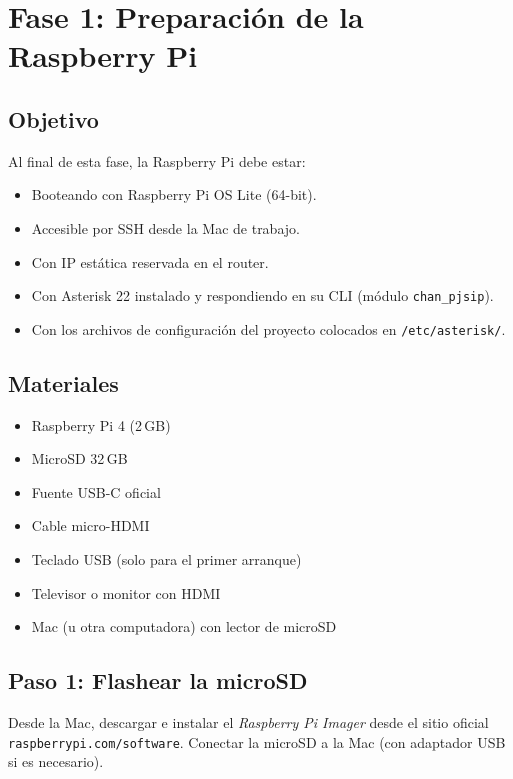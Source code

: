 \chapter{Fase 1: Preparación de la Raspberry Pi}

\section{Objetivo}

Al final de esta fase, la Raspberry Pi debe estar:

\begin{itemize}
  \item Booteando con Raspberry Pi OS Lite (64-bit).
  \item Accesible por SSH desde la Mac de trabajo.
  \item Con IP estática reservada en el router.
  \item Con Asterisk 22 instalado y respondiendo en su CLI (módulo \texttt{chan\_pjsip}).
  \item Con los archivos de configuración del proyecto colocados en \texttt{/etc/asterisk/}.
\end{itemize}

\section{Materiales}

\begin{itemize}
  \item Raspberry Pi 4 (2\,GB)
  \item MicroSD 32\,GB
  \item Fuente USB-C oficial
  \item Cable micro-HDMI
  \item Teclado USB (solo para el primer arranque)
  \item Televisor o monitor con HDMI
  \item Mac (u otra computadora) con lector de microSD
\end{itemize}

\section{Paso 1: Flashear la microSD}

Desde la Mac, descargar e instalar el \emph{Raspberry Pi Imager} desde el sitio oficial \texttt{raspberrypi.com/software}. Conectar la microSD a la Mac (con adaptador USB si es necesario).

